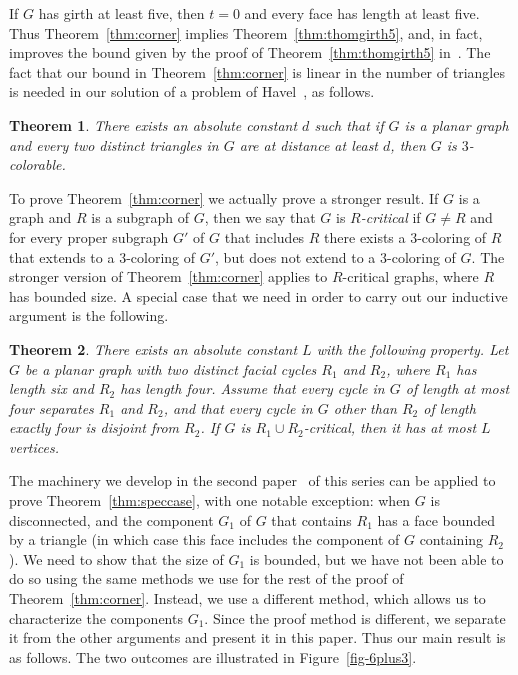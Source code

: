 \documentclass{article}
\def\mylabel#1{{\label{#1}}}
\newtheorem{theorem}{Theorem}
\begin{document}
If $G$ has girth at least five, then $t=0$ and every face has length
at least five.
Thus Theorem~\ref{thm:corner} implies Theorem~\ref{thm:thomgirth5},
and, in fact, improves the bound given by the proof of 
Theorem~\ref{thm:thomgirth5} in~\cite{thom-surf}.
The fact that our bound in Theorem~\ref{thm:corner} is linear in the
number of triangles is needed in our solution of a problem of 
Havel~\cite{conj-havel}, as follows.

\begin{theorem}
\mylabel{havel}
There exists an absolute constant $d$ such that if $G$ is a planar
graph and every two distinct triangles in $G$ are at distance at least $d$,
then $G$ is $3$-colorable.
\end{theorem}

To prove Theorem~\ref{thm:corner} we actually prove a stronger result.
If $G$ is a graph and $R$ is a subgraph of $G$, then we say that $G$
is {\em $R$-critical} if $G\ne R$ and for every proper subgraph $G'$ of
$G$ that includes $R$ there exists a $3$-coloring of $R$ that extends to
a $3$-coloring of $G'$, but does not extend to a $3$-coloring of $G$.
The stronger version of Theorem~\ref{thm:corner} applies to $R$-critical
graphs, where $R$ has bounded size.
A special case that we need in order to carry out our inductive argument
is the following.

\begin{theorem}
\mylabel{thm:speccase}
There exists an absolute constant $L$ with the following property.
Let $G$ be a planar graph with two distinct facial cycles $R_1$ and $R_2$,
where $R_1$ has length six and $R_2$ has length four.
Assume that every cycle in $G$ of length at most four separates $R_1$ and 
$R_2$, and that every cycle in $G$ other than $R_2$ of length exactly four is disjoint
from $R_2$.
If $G$ is $R_1\cup R_2$-critical, then it has at most $L$ vertices.
\end{theorem}

The machinery we develop in the second paper~\cite{proof-druhy} 
of this series can be
applied to prove Theorem~\ref{thm:speccase}, with one notable
exception: when $G$ is disconnected, and the component $G_1$ of $G$
that contains $R_1$ has a face bounded by a triangle
(in which case this face includes the component of $G$ containing $R_2$).
We need to show that the size of $G_1$ is bounded, but we have not been able to do
so using the same methods we use for the rest of the proof of 
Theorem~\ref{thm:corner}.
Instead, we use a different method, which allows us to characterize
the components $G_1$.
Since the proof method is different, we separate it from the other
arguments and present it in this paper.
Thus our main result is as follows.
The two outcomes are illustrated in Figure~\ref{fig-6plus3}.
\end{document}
